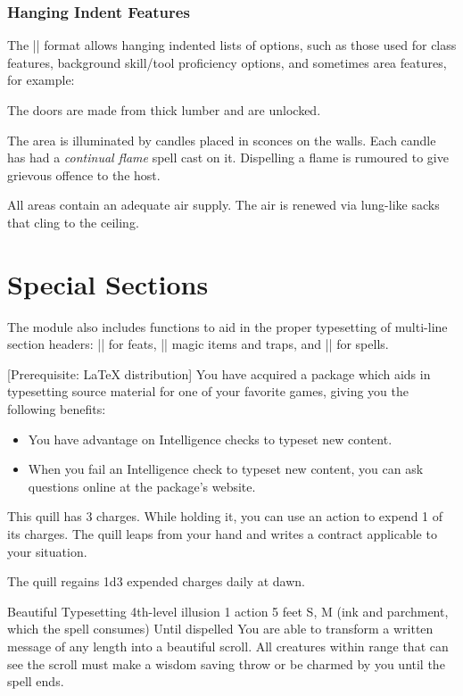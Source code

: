 \documentclass[letterpaper,twocolumn,openany,nodeprecatedcode]{dndbook}
\begin{document}
\subsubsection{Hanging Indent Features}
The |\listparagraph| format allows hanging indented
lists of options, such as those used for class features,
background skill/tool proficiency options, and
sometimes area features, for example:

{The doors are made from thick lumber and are unlocked.}

{The area is illuminated by candles placed in sconces on the
walls. Each candle has had a \textit{continual flame} spell
cast on it. Dispelling a flame is rumoured to give grievous offence
to the host.}

{All areas contain an adequate air supply. The air is renewed
via lung-like sacks that cling to the ceiling.}

\section{Special Sections}
The module also includes functions to aid in the proper typesetting of multi-line section headers: |\DndFeatHeader| for feats, |\DndItemHeader| magic items and traps, and |\DndSpellHeader| for spells.

[Prerequisite: \LaTeX{} distribution]
You have acquired a package which aids in typesetting source material for one of your favorite games, giving you the following benefits:

\begin{itemize}
  \item You have advantage on Intelligence checks to typeset new content.
  \item When you fail an Intelligence check to typeset new content, you can ask questions online at the package's website.
\end{itemize}

This quill has 3 charges. While holding it, you can use an action to expend 1 of its charges. The quill leaps from your hand and writes a contract applicable to your situation.

The quill regains 1d3 expended charges daily at dawn.

\DndSpellHeader%
  {Beautiful Typesetting}
  {4th-level illusion}
  {1 action}
  {5 feet}
  {S, M (ink and parchment, which the spell consumes)}
  {Until dispelled}
You are able to transform a written message of any length into a beautiful scroll. All creatures within range that can see the scroll must make a wisdom saving throw or be charmed by you until the spell ends.
\end{document}
